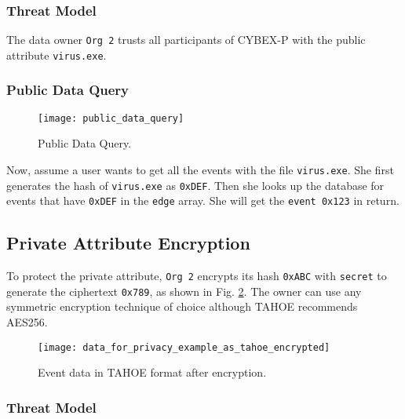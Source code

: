 


\subsubsection*{\textbf{Threat Model}}

The data owner \texttt{Org 2} trusts all participants of CYBEX-P with the public attribute \texttt{virus.exe}.

\subsubsection*{\textbf{Public Data Query}}

\begin{figure}[ht]
	\texttt{[image: public\_data\_query]} %
	\centering
	\caption{Public Data Query.}
	\label{fig:pubque}
\end{figure}

Now, assume a user wants to get all the events with the file \texttt{virus.exe}. She first generates the hash of \texttt{virus.exe} as \texttt{0xDEF}. Then she looks up the database for events that have \texttt{0xDEF} in the \texttt{edge} array. She will get the \texttt{event 0x123} in return.

\subsection{Private Attribute Encryption}

To protect the private attribute, \texttt{Org 2} encrypts its hash \texttt{0xABC} with \texttt{secret} to generate the ciphertext \texttt{0x789}, as shown in Fig. \ref{fig:priv3}. The owner can use any symmetric encryption technique of choice although TAHOE recommends AES256.

\begin{figure}[ht]
	\texttt{[image: data\_for\_privacy\_example\_as\_tahoe\_encrypted]} %
	\centering
	\caption{Event data in TAHOE format after encryption.}
	\label{fig:priv3}
\end{figure}

\subsubsection*{\textbf{Threat Model}}

